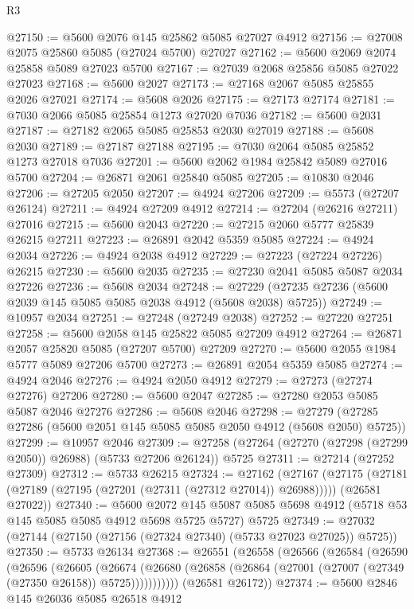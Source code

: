 \begin{lexlean}{R3}
\begin{coremodule}
@27150 := @5600 @2076 @145 @25862 @5085 @27027 @4912
@27156 := @27008 @2075 @25860 @5085 (@27024 @5700) @27027
@27162 := @5600 @2069 @2074 @25858 @5089 @27023 @5700
@27167 := @27039 @2068 @25856 @5085 @27022 @27023
@27168 := @5600 @2027
@27173 := @27168 @2067 @5085 @25855 @2026 @27021
@27174 := @5608 @2026
@27175 := @27173 @27174
@27181 := @7030 @2066 @5085 @25854 @1273 @27020 @7036
@27182 := @5600 @2031
@27187 := @27182 @2065 @5085 @25853 @2030 @27019
@27188 := @5608 @2030
@27189 := @27187 @27188
@27195 := @7030 @2064 @5085 @25852 @1273 @27018 @7036
@27201 := @5600 @2062 @1984 @25842 @5089 @27016 @5700
@27204 := @26871 @2061 @25840 @5085
@27205 := @10830 @2046
@27206 := @27205 @2050
@27207 := @4924 @27206
@27209 := @5573 (@27207 @26124)
@27211 := @4924 @27209 @4912
@27214 := @27204 (@26216 @27211) @27016
@27215 := @5600 @2043
@27220 := @27215 @2060 @5777 @25839 @26215 @27211
@27223 := @26891 @2042 @5359 @5085
@27224 := @4924 @2034
@27226 := @4924 @2038 @4912
@27229 := @27223 (@27224 @27226) @26215
@27230 := @5600 @2035
@27235 := @27230 @2041 @5085 @5087 @2034 @27226
@27236 := @5608 @2034
@27248 := @27229 (@27235 @27236 (@5600 @2039 @145 @5085 @5085 @2038 @4912 (@5608 @2038) @5725))
@27249 := @10957 @2034
@27251 := @27248 (@27249 @2038)
@27252 := @27220 @27251
@27258 := @5600 @2058 @145 @25822 @5085 @27209 @4912
@27264 := @26871 @2057 @25820 @5085 (@27207 @5700) @27209
@27270 := @5600 @2055 @1984 @5777 @5089 @27206 @5700
@27273 := @26891 @2054 @5359 @5085
@27274 := @4924 @2046
@27276 := @4924 @2050 @4912
@27279 := @27273 (@27274 @27276) @27206
@27280 := @5600 @2047
@27285 := @27280 @2053 @5085 @5087 @2046 @27276
@27286 := @5608 @2046
@27298 := @27279 (@27285 @27286 (@5600 @2051 @145 @5085 @5085 @2050 @4912 (@5608 @2050) @5725))
@27299 := @10957 @2046
@27309 := @27258 (@27264 (@27270 (@27298 (@27299 @2050)) @26988) (@5733 @27206 @26124)) @5725
@27311 := @27214 (@27252 @27309)
@27312 := @5733 @26215
@27324 := @27162
    (@27167
      (@27175 (@27181 (@27189 (@27195 (@27201 (@27311 (@27312 @27014)) @26988)))))
      (@26581 @27022))
@27340 := @5600
    @2072
    @145
    @5087
    @5085
    @5698
    @4912
    (@5718 @53 @145 @5085 @5085 @4912 @5698 @5725 @5727)
    @5725
@27349 := @27032 (@27144 (@27150 (@27156 (@27324 @27340) (@5733 @27023 @27025)) @5725))
@27350 := @5733 @26134
@27368 := @26551
    (@26558
      (@26566
        (@26584
          (@26590
            (@26596
              (@26605
                (@26674
                  (@26680 (@26858 (@26864 (@27001 (@27007 (@27349 (@27350 @26158)) @5725)))))))))))
      (@26581 @26172))
@27374 := @5600 @2846 @145 @26036 @5085 @26518 @4912

\end{coremodule}
\end{lexlean}
